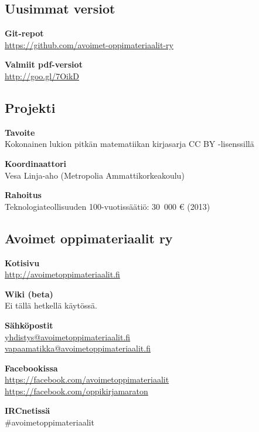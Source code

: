\subsection*{Uusimmat versiot}

\textbf{Git-repot} \\
\url{https://github.com/avoimet-oppimateriaalit-ry}

\textbf{Valmiit pdf-versiot} \\
\url{http://goo.gl/7OikD}

\subsection*{Projekti}

\textbf{Tavoite} \\
Kokonainen lukion pitkän matematiikan kirjasarja CC BY -lisenssillä

\textbf{Koordinaattori} \\
Vesa Linja-aho (Metropolia Ammattikorkeakoulu)

\textbf{Rahoitus} \\
Teknologiateollisuuden 100-vuotissäätiö: 30~000 \euro \; (2013)

\subsection*{Avoimet oppimateriaalit ry}

\textbf{Kotisivu} \\
\url{http://avoimetoppimateriaalit.fi}

\textbf{Wiki (beta)} \\
Ei tällä hetkellä käytössä.

\textbf{Sähköpostit} \\
\href{mailto:yhdistys@avoimetoppimateriaalit.fi}{yhdistys@avoimetoppimateriaalit.fi} \\
\href{mailto:vapaamatikka@avoimetoppimateriaalit.fi}{vapaamatikka@avoimetoppimateriaalit.fi}

\textbf{Facebookissa} \\
\url{https://facebook.com/avoimetoppimateriaalit} \\
\url{https://facebook.com/oppikirjamaraton}

\textbf{IRCnetissä} \\
\#avoimetoppimateriaalit

